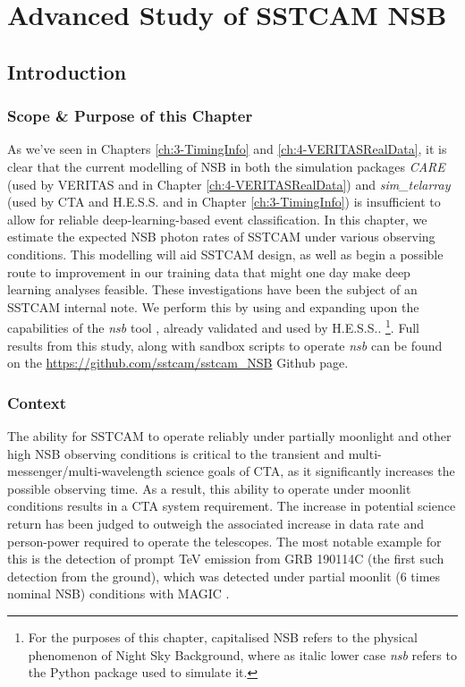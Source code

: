 \chapter{\label{ch:5-CHECNSB} Advanced Study of SSTCAM NSB}
\minitoc
\section{Introduction}
\label{sec:intro}

\subsection{Scope \& Purpose of this Chapter}
\label{sec:intro:scope}
As we've seen in Chapters \ref{ch:3-TimingInfo} and \ref{ch:4-VERITASRealData}, it is clear that the current modelling of NSB in both the simulation packages \textit{CARE} (used by VERITAS and in Chapter \ref{ch:4-VERITASRealData}) and \textit{sim\_telarray} (used by CTA and H.E.S.S. and in Chapter \ref{ch:3-TimingInfo}) is insufficient to allow for reliable deep-learning-based event classification. In this chapter, we estimate the expected NSB photon rates of SSTCAM under various observing conditions. This modelling will aid SSTCAM design, as well as begin a possible route to improvement in our training data that might one day make deep learning analyses feasible. These investigations have been the subject of an SSTCAM internal note. We perform this by using and expanding upon the capabilities of the \textit{nsb} tool \cite{nsb}, already validated and used by H.E.S.S.. \footnote{For the purposes of this chapter, capitalised NSB refers to the physical phenomenon of Night Sky Background, where as italic lower case \textit{nsb} refers to the Python package used to simulate it.}. Full results from this study, along with sandbox scripts to operate \textit{nsb} can be found on the \url{https://github.com/sstcam/sstcam_NSB} Github page. 

\subsection{Context}
\label{sec:intro:context}
The ability for SSTCAM to operate reliably under partially moonlight and other high NSB observing conditions is critical to the transient and multi-messenger/multi-wavelength science goals of CTA, as it significantly increases the possible observing time. As a result, this ability to operate under moonlit conditions results in a CTA system requirement. The increase in potential science return has been judged to outweigh the associated increase in data rate and person-power required to operate the telescopes. The most notable example for this is the detection of prompt TeV emission from GRB 190114C (the first such detection from the ground), which was detected under partial moonlit (6 times nominal NSB) conditions with MAGIC \cite{magicGRB}. 

